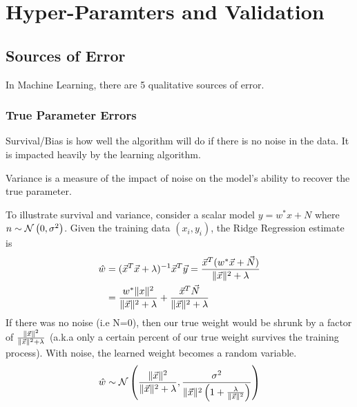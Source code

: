 \section{Hyper-Paramters and Validation}
\subsection{Sources of Error}
In Machine Learning, there are 5 qualitative sources of error.
\subsubsection{True Parameter Errors}
\begin{definition}
  Survival/Bias is how well the algorithm will do if there is no noise in the data. It is impacted heavily by the learning algorithm.
\end{definition}
\begin{definition}
  Variance is a measure of the impact of noise on the model's ability to recover the true parameter.
\end{definition}
To illustrate survival and variance, consider a scalar model $y=w^*x+N$ where $n\sim\mathcal{N}\left(0, \sigma^2\right)$. Given the training data $(x_i, y_i)$, the Ridge Regression estimate is 
\begin{align*}
  \hat{w} &= (\vec{x}^T\vec{x}+\lambda)^{-1}\vec{x}^T\vec{y} = \frac{\vec{x}^T(w^*\vec{x}+\vec{N})}{\|\vec{x}\|^2+\lambda}\\
    &= \frac{w^*\|x\|^2}{\|\vec{x}\|^2+\lambda}+\frac{\vec{x}^T\vec{N}}{\|\vec{x}\|^2+\lambda}
\end{align*}
If there was no noise (i.e N=0), then our true weight would be shrunk by a factor of $\frac{\|\vec{x}\|^2}{\|\vec{x}\|^2+\lambda}$ (a.k.a only a certain percent of our true weight survives the training process). With noise, the learned weight becomes a random variable.
\[
  \hat{w}\sim\mathcal{N}\left(\frac{\|\vec{x}\|^2}{\|\vec{x}\|^2+\lambda}, \frac{\sigma^2}{\|\vec{x}\|^2\left( 1+\frac{\lambda}{\|\vec{x}\|^2} \right)}\right)
\]
